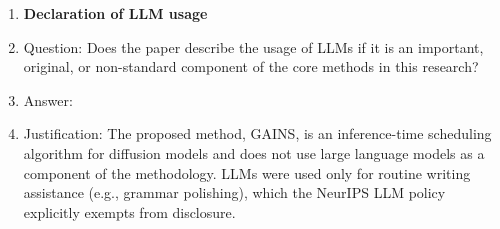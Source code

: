 \begin{enumerate}
\item {\bf Declaration of LLM usage}
\item[] Question: Does the paper describe the usage of LLMs if it is an important, original, or non-standard component of the core methods in this research?
\item[] Answer: \answerNA{}
\item[] Justification: The proposed method, \textsc{GAINS}, is an inference-time scheduling algorithm for diffusion models and does not use large language models as a component of the methodology. LLMs were used only for routine writing assistance (e.g., grammar polishing), which the NeurIPS LLM policy explicitly exempts from disclosure.

\end{enumerate}
